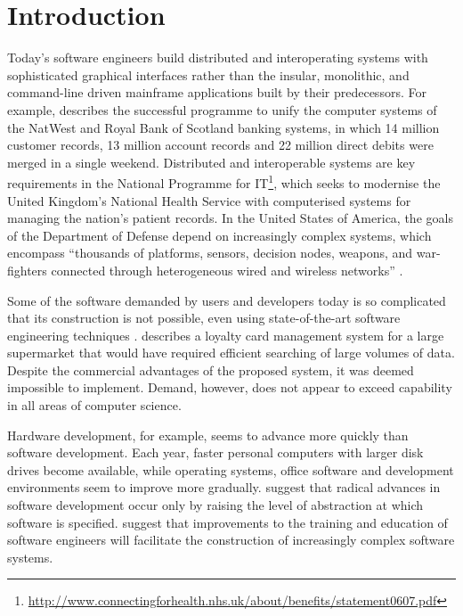
\chapter{Introduction}
\label{Introduction}
Today's software engineers build distributed and interoperating systems with sophisticated graphical interfaces rather than the insular, monolithic, and command-line driven mainframe applications built by their predecessors. For example, \cite[pg26]{rae04challenges} describes the successful programme to unify the computer systems of the NatWest and Royal Bank of Scotland banking systems, in which 14 million customer records, 13 million account records and 22 million direct debits were merged in a single weekend. Distributed and interoperable systems are key requirements in the National Programme for IT\footnote{\url{http://www.connectingforhealth.nhs.uk/about/benefits/statement0607.pdf}}, which seeks to modernise the United Kingdom's National Health Service with computerised systems for managing the nation's patient records. In the United States of America, the goals of the Department of Defense depend on increasingly complex systems, which encompass ``thousands of platforms, sensors, decision nodes, weapons, and war-fighters connected through heterogeneous wired and wireless networks'' \cite{northrop06ulss}.

Some of the software demanded by users and developers today is so complicated that its construction is not possible, even using state-of-the-art software engineering techniques \cite{selic03pragmatics}. \cite[pg15]{rae04challenges} describes a loyalty card management system for a large supermarket that would have required efficient searching of large volumes of data. Despite the commercial advantages of the proposed system, it was deemed impossible to implement. Demand, however, does not appear to exceed capability in all areas of computer science.


Hardware development, for example, seems to advance more quickly than software development. Each year, faster personal computers with larger disk drives become available, while operating systems, office software and development environments seem to improve more gradually. \cite{brooks86nosilverbullet,selic03pragmatics,kleppe03mda} suggest that radical advances in software development occur only by raising the level of abstraction at which software is specified. \cite{rae04challenges} suggest that improvements to the training and education of software engineers will facilitate the construction of increasingly complex software systems.



